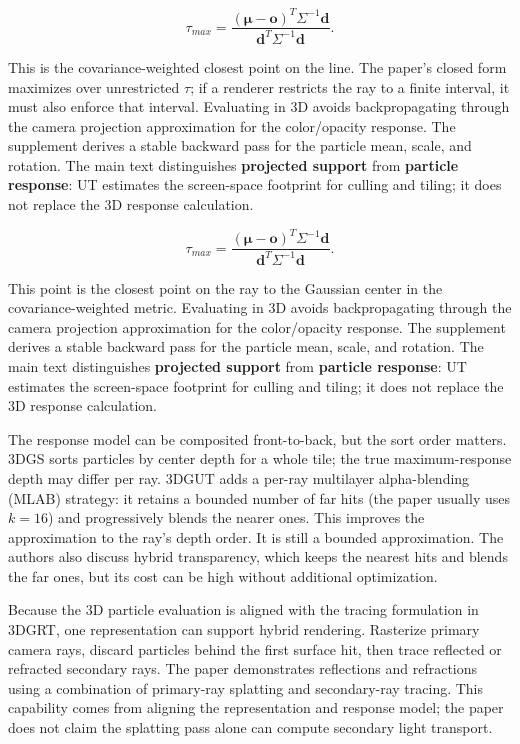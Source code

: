 \[\tau_{max}=\frac{(\boldsymbol\mu-\mathbf{o})^T\Sigma^{-1}\mathbf{d}}{\mathbf{d}^T\Sigma^{-1}\mathbf{d}}.\]

This is the covariance-weighted closest point on the line. The paper's closed form maximizes over unrestricted \(\tau\); if a renderer restricts the ray to a finite interval, it must also enforce that interval. Evaluating in 3D avoids backpropagating through the camera projection approximation for the color/opacity response. The supplement derives a stable backward pass for the particle mean, scale, and rotation. The main text distinguishes \textbf{projected support} from \textbf{particle response}: UT estimates the screen-space footprint for culling and tiling; it does not replace the 3D response calculation.

\[\tau_{max}=\frac{(\boldsymbol\mu-\mathbf{o})^T\Sigma^{-1}\mathbf{d}}{\mathbf{d}^T\Sigma^{-1}\mathbf{d}}.\]

This point is the closest point on the ray to the Gaussian center in the covariance-weighted metric. Evaluating in 3D avoids backpropagating through the camera projection approximation for the color/opacity response. The supplement derives a stable backward pass for the particle mean, scale, and rotation. The main text distinguishes \textbf{projected support} from \textbf{particle response}: UT estimates the screen-space footprint for culling and tiling; it does not replace the 3D response calculation.

The response model can be composited front-to-back, but the sort order matters. 3DGS sorts particles by center depth for a whole tile; the true maximum-response depth may differ per ray. 3DGUT adds a per-ray multilayer alpha-blending (MLAB) strategy: it retains a bounded number of far hits (the paper usually uses \(k=16\)) and progressively blends the nearer ones. This improves the approximation to the ray's depth order. It is still a bounded approximation. The authors also discuss hybrid transparency, which keeps the nearest hits and blends the far ones, but its cost can be high without additional optimization.

Because the 3D particle evaluation is aligned with the tracing formulation in 3DGRT, one representation can support hybrid rendering. Rasterize primary camera rays, discard particles behind the first surface hit, then trace reflected or refracted secondary rays. The paper demonstrates reflections and refractions using a combination of primary-ray splatting and secondary-ray tracing. This capability comes from aligning the representation and response model; the paper does not claim the splatting pass alone can compute secondary light transport.

